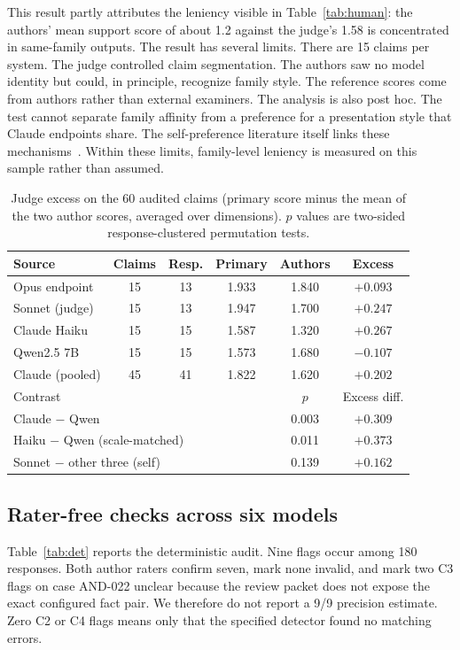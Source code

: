 \documentclass[conference]{IEEEtran}
\newcommand{\checkc}[1]{\textsc{#1}}
\begin{document}
This result partly attributes the leniency visible in
Table~\ref{tab:human}: the authors' mean support score of about 1.2 against the
judge's 1.58 is concentrated in same-family outputs. The result has several
limits. There are 15 claims per system. The judge controlled claim segmentation. The
authors saw no model identity but could, in principle, recognize family style.
The reference scores come from authors rather than external examiners. The
analysis is also post hoc. The test cannot separate family affinity from a
preference for a presentation style that Claude endpoints share. The self-preference literature
itself links these mechanisms~\cite{panickssery2024}. Within these limits,
family-level leniency is measured on this sample rather than assumed.

\begin{table}[t]
\centering
\caption{Judge excess on the 60 audited claims (primary score minus the mean of
the two author scores, averaged over dimensions). $p$ values are two-sided
response-clustered permutation tests.}
\label{tab:family}
\scriptsize
\begin{tabular}{lccccc}
\toprule
Source & Claims & Resp. & Primary & Authors & Excess \\
\midrule
Opus endpoint & 15 & 13 & 1.933 & 1.840 & $+0.093$ \\
Sonnet (judge) & 15 & 13 & 1.947 & 1.700 & $+0.247$ \\
Claude Haiku & 15 & 15 & 1.587 & 1.320 & $+0.267$ \\
Qwen2.5 7B & 15 & 15 & 1.573 & 1.680 & $-0.107$ \\
\midrule
Claude (pooled) & 45 & 41 & 1.822 & 1.620 & $+0.202$ \\
\midrule
\multicolumn{4}{l}{Contrast} & $p$ & Excess diff. \\
\midrule
\multicolumn{4}{l}{Claude $-$ Qwen} & 0.003 & $+0.309$ \\
\multicolumn{4}{l}{Haiku $-$ Qwen (scale-matched)} & 0.011 & $+0.373$ \\
\multicolumn{4}{l}{Sonnet $-$ other three (self)} & 0.139 & $+0.162$ \\
\bottomrule
\end{tabular}
\end{table}

\subsection{Rater-free checks across six models}
Table~\ref{tab:det} reports the deterministic audit. Nine flags occur among 180
responses. Both author raters confirm seven, mark none invalid, and mark two
\checkc{C3} flags on case AND-022 unclear because the review packet does
not expose the exact configured fact pair. We therefore do not report a 9/9
precision estimate. Zero \checkc{C2} or \checkc{C4} flags means only that the
specified detector found no matching errors.
\end{document}
